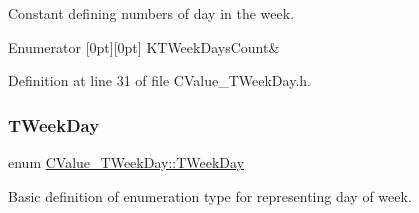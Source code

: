 Constant defining numbers of day in the week. 

\begin{DoxyEnumFields}{Enumerator}
[0pt][0pt]{}\mbox{\label{namespace_c_value___t_week_day_aafc13db7f1761bc02fc24499d9d30ef8aa662532b91895c243892c79eaafea534}} 
K\+T\+Week\+Days\+Count&\\
\hline

\end{DoxyEnumFields}


Definition at line 31 of file C\+Value\+\_\+\+T\+Week\+Day.\+h.

\mbox{\label{namespace_c_value___t_week_day_a6412f204509f223b789fb5f1a61a6124}} 
\subsubsection{\texorpdfstring{T\+Week\+Day}{TWeekDay}}
{\footnotesize\ttfamily enum \hyperlink{namespace_c_value___t_week_day_a6412f204509f223b789fb5f1a61a6124}{C\+Value\+\_\+\+T\+Week\+Day\+::\+T\+Week\+Day}}



Basic definition of enumeration type for representing day of week. 

